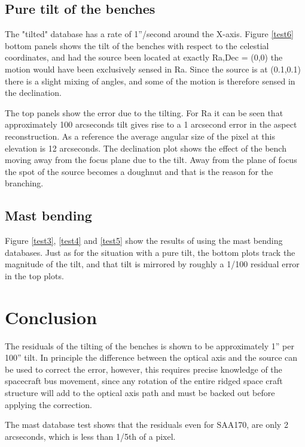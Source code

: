 \subsection{Pure tilt of the benches}
The "tilted" database has a rate of 1''/second around the X-axis. Figure \ref{test6} bottom panels shows the tilt of the benches with respect to the celestial coordinates, and had the source been located at exactly Ra,Dec = (0,0) the motion would have been exclusively sensed in Ra. Since the source is at (0.1,0.1) there is a slight mixing of angles, and some of the motion is therefore sensed in the declination.

The top panels show the error due to the tilting. For Ra it can be seen that approximately 100 arcseconds tilt gives rise to a 1 arcsecond error in the aspect reconstruction. As a reference the average angular size of the pixel at this elevation is 12 arcseconds. The declination plot shows the effect of the bench moving away from the focus plane due to the tilt. Away from the plane of focus the spot of the source becomes a doughnut and that is the reason for the branching.

\subsection{Mast bending}
Figure \ref{test3}, \ref{test4} and \ref{test5} show the results of using the mast bending databases. Just as for the situation with a pure tilt, the bottom plots track the magnitude of the tilt, and that tilt is mirrored by roughly a 1/100 residual error in the top plots.

\section{Conclusion}
The residuals of the tilting of the benches is shown to be approximately 1'' per 100'' tilt. In principle the difference between the optical axis and the source can be used to correct the error, however, this requires precise knowledge of the spacecraft bus movement, since any rotation of the entire ridged space craft structure will add to the optical axis path and must be backed out before applying the correction.

The mast database test shows that the residuals even for SAA170, are only 2 arcseconds, which is less than 1/5th of a pixel. 

